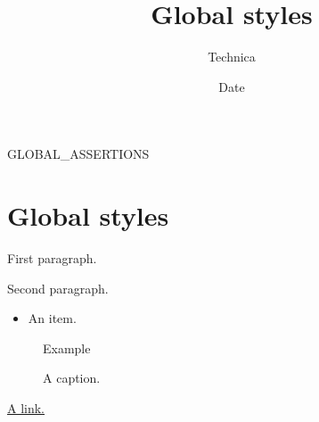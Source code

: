 \documentclass{article}
\title{\checktitlefont Global styles}
\author{\checkmetadatafont Technica}
\date{\checkmetadatafont Date}
\begin{document}
\makeatletter
GLOBAL_ASSERTIONS
\makeatother
\maketitle
\section{Global styles}
First paragraph.

Second paragraph.
\begin{itemize}\item An item.\end{itemize}
\begin{figure}[h]\centering Example\caption{A caption.}\end{figure}
\href{https://example.com}{A link.}
\end{document}
